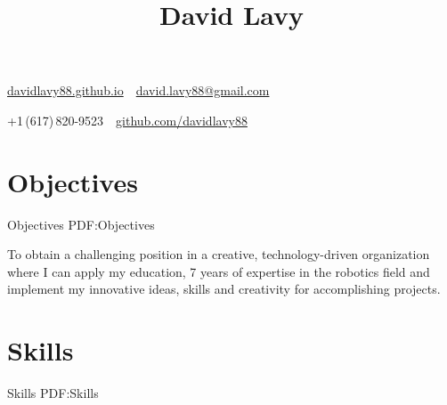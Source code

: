\documentclass[letterpaper,MMMyyyy,nonstop]{simpleresumecv}
\newcommand{\CVAuthor}{David Lavy}
\newcommand{\CVWebpage}{davidlavy88.github.io}
\newcommand*{\TitleFont}{%
      \usefont{\encodingdefault}{\rmdefault}{bx}{n}%
      \fontsize{20}{24}%
      \selectfont}
\begin{document}

\title{\TitleFont \CVAuthor}

\begin{subtitle}
\href{\CVWebpage}
{\CVWebpage}
\,\SubBulletSymbol\,
\href{mailto:david.lavy88@gmail.com}
{david.lavy88@gmail.com}
\par
+1\,(617)\,820-9523
\,\SubBulletSymbol\,
\href{https://github.com/davidlavy88}
{github.com/davidlavy88}

\end{subtitle}

\begin{body}


\section
{Objectives}
{Objectives}
{PDF:Objectives}

To obtain a challenging position in a creative, technology-driven organization where I can apply my education, 7 years of expertise in the robotics field and implement my innovative ideas, skills and creativity for accomplishing projects.


\section
{Skills}
{Skills}
{PDF:Skills}


\end{body}
\end{document}
